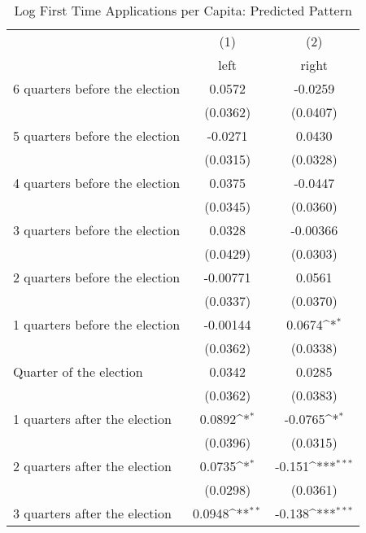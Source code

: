 \begin{table}[htbp]\centering
\def\sym#1{\ifmmode^{#1}\else\(^{#1}\)\fi}
\caption{Log First Time Applications per Capita: Predicted Pattern}
\begin{tabular}{l*{2}{c}}
\hline\hline
                    &\multicolumn{1}{c}{(1)}&\multicolumn{1}{c}{(2)}\\
                    &\multicolumn{1}{c}{left}&\multicolumn{1}{c}{right}\\
\hline
 6 quarters before the election&      0.0572         &     -0.0259         \\
                    &    (0.0362)         &    (0.0407)         \\
[1em]
 5 quarters before the election&     -0.0271         &      0.0430         \\
                    &    (0.0315)         &    (0.0328)         \\
[1em]
 4 quarters before the election&      0.0375         &     -0.0447         \\
                    &    (0.0345)         &    (0.0360)         \\
[1em]
 3 quarters before the election&      0.0328         &    -0.00366         \\
                    &    (0.0429)         &    (0.0303)         \\
[1em]
 2 quarters before the election&    -0.00771         &      0.0561         \\
                    &    (0.0337)         &    (0.0370)         \\
[1em]
 1 quarters before the election&    -0.00144         &      0.0674\sym{*}  \\
                    &    (0.0362)         &    (0.0338)         \\
[1em]
Quarter of the election&      0.0342         &      0.0285         \\
                    &    (0.0362)         &    (0.0383)         \\
[1em]
 1 quarters after the election&      0.0892\sym{*}  &     -0.0765\sym{*}  \\
                    &    (0.0396)         &    (0.0315)         \\
[1em]
 2 quarters after the election&      0.0735\sym{*}  &      -0.151\sym{***}\\
                    &    (0.0298)         &    (0.0361)         \\
[1em]
 3 quarters after the election&      0.0948\sym{**} &      -0.138\sym{***}\\

\end{tabular}
\end{table}
